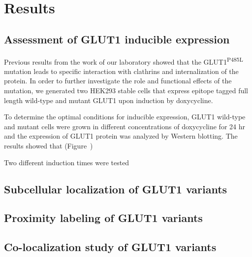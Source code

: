 
\chapter{Results} %
\label{Chapter3} %
\section{Assessment of GLUT1 inducible expression}
Previous results from the work of our laboratory showed that the GLUT1\textsuperscript{P485L} mutation leads to specific interaction with clathrins and internalization of the protein. In order to further investigate the role and functional effects of the mutation, we generated two HEK293 stable cells that express epitope tagged full length wild-type and mutant GLUT1 upon induction by doxycycline. 

To determine the optimal conditions for inducible expression, GLUT1 wild-type and mutant cells were grown in different concentrations of doxycycline for 24 hr and the expression of GLUT1 protein was analyzed by Western blotting. The results showed that (Figure~)

Two different induction times were tested


\section{Subcellular localization of GLUT1 variants}

\section{Proximity labeling of GLUT1 variants}

\section{Co-localization study of GLUT1 variants}

